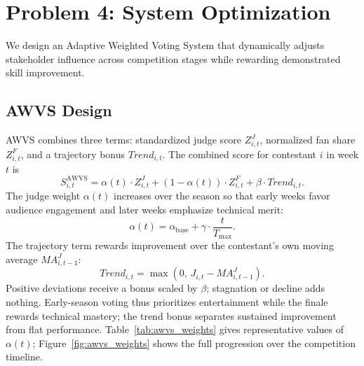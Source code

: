 \documentclass{mcmthesis}
\begin{document}


\section{Problem 4: System Optimization}
\label{sec:awvs}

We design an Adaptive Weighted Voting System that dynamically adjusts stakeholder influence across competition stages while rewarding demonstrated skill improvement.

\subsection{AWVS Design}

AWVS combines three terms: standardized judge score $Z^{J}_{i,t}$, normalized fan share $Z^{F}_{i,t}$, and a trajectory bonus $Trend_{i,t}$. The combined score for contestant $i$ in week $t$ is
\begin{equation}
S^{\text{AWVS}}_{i,t} = \alpha(t) \cdot Z^{J}_{i,t} + (1-\alpha(t)) \cdot Z^{F}_{i,t} + \beta \cdot Trend_{i,t}.
\end{equation}
The judge weight $\alpha(t)$ increases over the season so that early weeks favor audience engagement and later weeks emphasize technical merit:
\begin{equation}
\alpha(t) = \alpha_{\text{base}} + \gamma \cdot \frac{t}{T_{\max}}.
\end{equation}
The trajectory term rewards improvement over the contestant's own moving average $MA^{J}_{i,t-1}$:
\begin{equation}
Trend_{i,t} = \max\left(0,\, J_{i,t} - MA^{J}_{i,t-1}\right).
\end{equation}
Positive deviations receive a bonus scaled by $\beta$; stagnation or decline adds nothing. Early-season voting thus prioritizes entertainment while the finale rewards technical mastery; the trend bonus separates sustained improvement from flat performance. Table~\ref{tab:awvs_weights} gives representative values of $\alpha(t)$; Figure~\ref{fig:awvs_weights} shows the full progression over the competition timeline.
\end{document}
